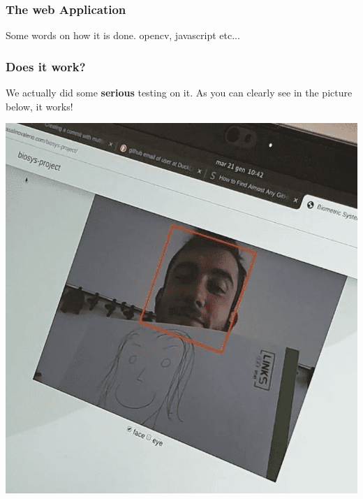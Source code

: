 \begin{frame} \frametitle{The web Application}

	Some words on how it is done. opencv, javascript etc...

\end{frame}

\begin{frame} \frametitle{Does it work?}

	We actually did some \textbf{serious} testing on it. As you can
	clearly see in the picture below, it works!
	\begin{center}
		\includegraphics[width=.45\textwidth]{img/serious-testing}
	\end{center}
	

\end{frame}